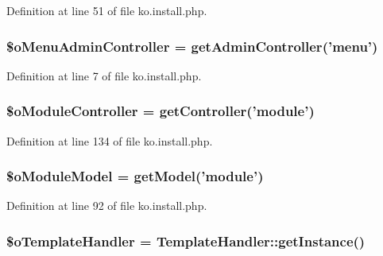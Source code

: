 Definition at line 51 of file ko.\+install.\+php.

\hypertarget{ko_8install_8php_a9062530c3b03479ca4530daee1c18887}{
\subsubsection[{\$o\+Menu\+Admin\+Controller}]{\setlength{\rightskip}{0pt plus 5cm}\$o\+Menu\+Admin\+Controller = {\bf get\+Admin\+Controller}('{\bf menu}')}}\label{ko_8install_8php_a9062530c3b03479ca4530daee1c18887}


Definition at line 7 of file ko.\+install.\+php.

\hypertarget{ko_8install_8php_aaae9128654f5054258982d94a0566987}{
\subsubsection[{\$o\+Module\+Controller}]{\setlength{\rightskip}{0pt plus 5cm}\$o\+Module\+Controller = {\bf get\+Controller}('{\bf module}')}}\label{ko_8install_8php_aaae9128654f5054258982d94a0566987}


Definition at line 134 of file ko.\+install.\+php.

\hypertarget{ko_8install_8php_a8d7a87df524e7d6938f66f8e284cdd1e}{
\subsubsection[{\$o\+Module\+Model}]{\setlength{\rightskip}{0pt plus 5cm}\$o\+Module\+Model = {\bf get\+Model}('{\bf module}')}}\label{ko_8install_8php_a8d7a87df524e7d6938f66f8e284cdd1e}


Definition at line 92 of file ko.\+install.\+php.

\hypertarget{ko_8install_8php_abd57e3ab220291ea9b5c16c2a4e0670e}{
\subsubsection[{\$o\+Template\+Handler}]{\setlength{\rightskip}{0pt plus 5cm}\$o\+Template\+Handler = {\bf Template\+Handler\+::get\+Instance}()}}\label{ko_8install_8php_abd57e3ab220291ea9b5c16c2a4e0670e}



